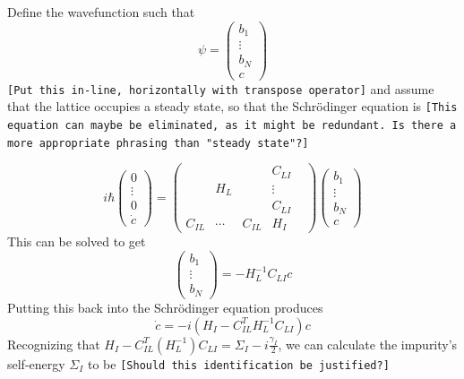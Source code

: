 \documentclass[aps,pra,superscriptaddress,twocolumn]{revtex4-1}
\newcommand{\commentSB}[1]{\texttt{\color{blue}[#1]}}
\newcommand{\commentTP}[1]{\texttt{\color{green}[#1]}}
\begin{document}
Define the wavefunction such that
\begin{equation} \psi = 
\begin{pmatrix}
    b_1 \\ \vdots \\ b_N \\ c
\end{pmatrix} 
\label{eqn:psi}
\end{equation}
\commentTP{Put this in-line, horizontally with transpose operator}
and assume that the lattice occupies a steady state, so that the Schr\"odinger equation is
\commentSB{This equation can maybe be eliminated, as it might be redundant. Is there a more appropriate phrasing than "steady state"?}

\begin{equation} i \hbar 
    \begin{pmatrix}
    0 \\ \vdots \\ 0 \\ \dot{c}
    \end{pmatrix} = \begin{pmatrix}
        ~ & ~ & ~ &   C_{LI} \\ 
        ~ & H_L & ~ & \vdots \\
        ~ & ~ & ~ & C_{LI} & \\
        C_{IL} & \cdots & C_{IL} & H_I   
    \end{pmatrix} \begin{pmatrix}
        b_1 \\ \vdots \\ b_N \\ c
    \end{pmatrix} 
\end{equation}
This can be solved to get 
\begin{equation}
    \begin{pmatrix}
        b_1 \\ \vdots \\ b_N
    \end{pmatrix} = - H_L^{-1} C_{LI} c
\end{equation}
Putting this back into the Schr\"odinger equation produces 
\begin{equation}
    \dot{c} = -i (H_I - C_{IL}^T H_L^{-1}C_{LI}) c
\end{equation}
Recognizing that $ H_I - C_{IL}^T (H_L^{-1}) C_{LI} = \Sigma_I - i \frac{\gamma_I}{2} $, we can calculate the impurity's self-energy $\Sigma_I$ to be 
\commentSB{Should this identification be justified?}
\end{document}
